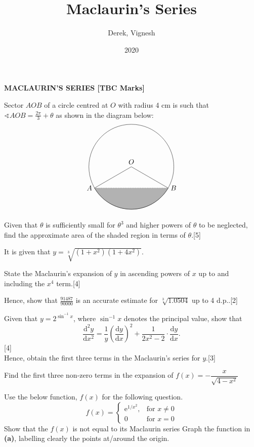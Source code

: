 \documentclass[12pt, a4 paper]{article}
\title{Maclaurin's Series}
\author{Derek, Vignesh}
\date{2020}
\begin{document}
\maketitle

\textbf{MACLAURIN'S SERIES [TBC Marks]}
\begin{outline}[enumerate]
 \1 Sector \(AOB\) of a circle centred at \(O\) with radius 4 cm is such that \(\sphericalangle AOB = \frac{2\pi}{3}+\theta \) as shown in the diagram below: %
 \[
  \begin{tikzpicture}
   \draw (0,0) node[above]{\(O\)} circle (60pt);
   \draw (-51.96152pt,-30pt) node[left]{\(A\)} -- (0,0);
   \draw (51.96152pt,-30pt) node[right]{\(B\)} -- (0,0);
   \filldraw[color=white!70!black,draw=black] (-51.96152pt,-30pt) arc (210:330:60pt);
   \draw[dotted](-51.96152pt,-30pt) -- (51.96152pt,-30pt);
  \end{tikzpicture}
 \]
 Given that \(\theta \) is sufficiently small for \(\theta^3\) and higher powers of \(\theta \) to be neglected, find the approximate area of the shaded region in terms of \(\theta \).\hfill[5]

 \1 It is given that \(y=\sqrt[3]{(1+x^2)(1+4x^2)}\). %

 \2 State the Maclaurin's expansion of \(y\) in ascending powers of \(x\) up to and including the \(x^4\) term.\hfill[4]

 \2 Hence, show that \(\frac{91487}{90000}\) is an accurate estimate for \(\sqrt[3]{1.0504}\)  up to 4 d.p..\hfill[2]

 \1 Given that \(y=2^{\sin^{-1}{x}}\), where \(\sin^{-1}{x}\) denotes the principal value, show that
 \begin{equation*}
  \dfrac{\mathrm{d}^2y}{\mathrm{d}x^2}=\dfrac{1}{y}{\left(\dfrac{\mathrm{d}y}{\mathrm{d}x}\right)}^2+\dfrac{1}{2x^2-2}\cdot \dfrac{\mathrm{d}y}{\mathrm{d}x}.
 \end{equation*}\hfill[4] \\
 Hence, obtain the first three terms in the Maclaurin's series for \(y\).\hfill[3] %

 \1 Find the first three non-zero terms in the expansion of \(f(x)=-\dfrac{x}{\sqrt{4-x^2}}\) %

 \1 Use the below function, \(f(x)\) for the following question. %
 \begin{equation*}
  f(x) = \begin{cases}
   \mathrm{e}^{1/x^2}, & \textrm{for }  x\neq0 \\
   0                   & \textrm{for } x=0
  \end{cases}
 \end{equation*}
 \2 Show that the \(f(x)\) is not equal to its Maclaurin series
 \2 Graph the function in \textbf{(a)}, labelling clearly the points at/around the origin.


\end{outline}
\end{document}
